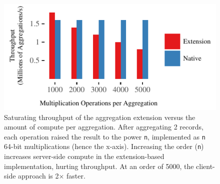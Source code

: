 \begin{figure}[t]
\centering
\includegraphics[width=1.0\columnwidth]{graphs/aggregate-mul-throughput.pdf}
  \caption{Saturating throughput of the aggregation extension versus the
    amount of compute per aggregation. After aggregating 2 records, each
    operation raised the result to the power \texttt{n}, implemented as
    \texttt{n} 64-bit multiplications (hence the x-axis). Increasing the
    order (\texttt{n}) increases server-side compute in the
    extension-based implementation, hurting throughput. At an order of
    5000, the client-side approach is 2$\times$ faster.}
\label{fig:aggregate-mul-sizes}
\end{figure}
